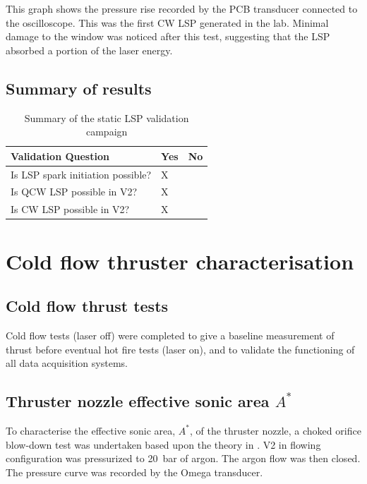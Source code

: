             This graph shows the pressure rise recorded by the PCB transducer connected to the oscilloscope. This was the first CW LSP generated in the lab. Minimal damage to the window was noticed after this test, suggesting that the LSP absorbed a portion of the laser energy.

        \subsection{Summary of results}

            \begin{table}[]
                \caption{Summary of the static LSP validation campaign}
                \label{tab:validation}
                \begin{tabular}{@{}lll@{}}
                \toprule
                Validation Question               & Yes & No \\ \midrule
                Is LSP spark initiation possible? & X   &    \\
                Is QCW LSP possible in V2?        & X   &    \\
                Is CW LSP possible in V2?         & X   &   
                \end{tabular}
            \end{table}


    \section{Cold flow thruster characterisation}

        \subsection{Cold flow thrust tests}

            Cold flow tests (laser off) were completed to give a baseline measurement of thrust before eventual hot fire tests (laser on), and to validate the functioning of all data acquisition systems.


        \subsection{Thruster nozzle effective sonic area $A^*$}

            To characterise the effective sonic area, $A^*$, of the thruster nozzle, a choked orifice blow-down test was undertaken based upon the theory in \textcite{saadCompressibleFluidFlow}. V2 in flowing configuration was pressurized to \qty{20}{bar} of argon. The argon flow was then closed. The pressure curve was recorded by the Omega  transducer.
            
